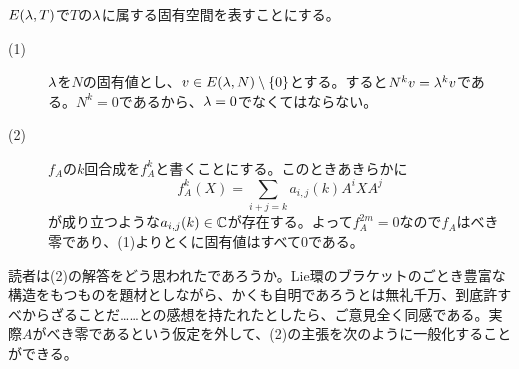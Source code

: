 \newpage


\subsubsection{}%
\begin{sol} $E({\lambda},T)$で$T$の${\lambda}$に属する固有空間を表すことにする。
\begin{description}
  \item[(1)] ${\lambda}$を$N$の固有値とし、$v \in E({\lambda},N) \setminus \{ 0 \}$とする。すると$N^k v = {\lambda}^k v$である。$N^k=0$であるから、${\lambda}=0$でなくてはならない。
  \item[(2)] $f_A$の$k$回合成を$f_A^k$と書くことにする。このときあきらかに
  \[
  f_A^k(X) = \sum_{i+j=k} a_{i,j}(k) A^i X A^j
  \]
が成り立つような$a_{i,j}(k) \in {\mathbb C}$が存在する。よって$f_A^{2m}=0$なので$f_A$はべき零であり、(1)よりとくに固有値はすべて$0$である。
\end{description}
\end{sol}

\begin{com}
  読者は(2)の解答をどう思われたであろうか。Lie環のブラケットのごとき豊富な構造をもつものを題材としながら、かくも自明であろうとは無礼千万、到底許すべからざることだ……との感想を持たれたとしたら、ご意見全く同感である。実際$A$がべき零であるという仮定を外して、(2)の主張を次のように一般化することができる。
\end{com}

